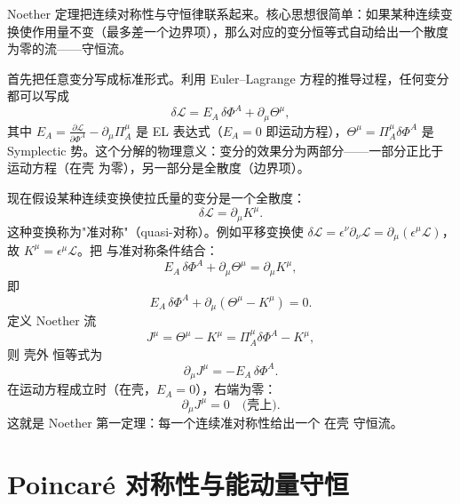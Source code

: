 Noether 定理把连续对称性与守恒律联系起来。核心思想很简单：如果某种连续变换使作用量不变（最多差一个边界项），那么对应的变分恒等式自动给出一个散度为零的流——守恒流。

首先把任意变分写成标准形式。利用 Euler--Lagrange 方程的推导过程，任何变分都可以写成
\begin{equation}\label{eq:ms-poincare-delta-L}
{
\delta\mathcal{L}=E_A\,\delta\Phi^A+\partial_\mu\Theta^\mu,
}
\end{equation}
其中 $E_A=\frac{\partial\mathcal{L}}{\partial\Phi^A}-\partial_\mu\Pi_A^\mu$ 是 EL 表达式（$E_A=0$ 即运动方程），$\Theta^\mu=\Pi_A^\mu\delta\Phi^A$ 是 Symplectic 势。这个分解的物理意义：变分的效果分为两部分——一部分正比于运动方程（在壳 为零），另一部分是全散度（边界项）。

现在假设某种连续变换使拉氏量的变分是一个全散度：
\begin{equation}
\delta\mathcal{L}=\partial_\mu K^\mu.
\end{equation}
这种变换称为"准对称"（quasi-对称）。例如平移变换使 $\delta\mathcal{L}=\epsilon^\nu\partial_\nu\mathcal{L}=\partial_\mu(\epsilon^\mu\mathcal{L})$，故 $K^\mu=\epsilon^\mu\mathcal{L}$。把 与准对称条件结合：
\begin{equation*}
E_A\,\delta\Phi^A+\partial_\mu\Theta^\mu=\partial_\mu K^\mu,
\end{equation*}
即
\begin{equation*}
E_A\,\delta\Phi^A+\partial_\mu(\Theta^\mu-K^\mu)=0.
\end{equation*}
定义 Noether 流
\begin{equation}\label{eq:ms-poincare-J-def}
{J^\mu=\Theta^\mu-K^\mu=\Pi_A^\mu\delta\Phi^A-K^\mu,}
\end{equation}
则 壳外 恒等式为
\begin{equation*}{\partial_\mu J^\mu=-E_A\,\delta\Phi^A.}
\end{equation*}
在运动方程成立时（在壳，$E_A=0$），右端为零：
\begin{equation}\label{eq:ms-poincare-noether}
{\partial_\mu J^\mu=0\quad\text{(壳上)}.}
\end{equation}
这就是 Noether 第一定理：每一个连续准对称性给出一个 在壳 守恒流。

\section{Poincaré 对称性与能动量守恒}

